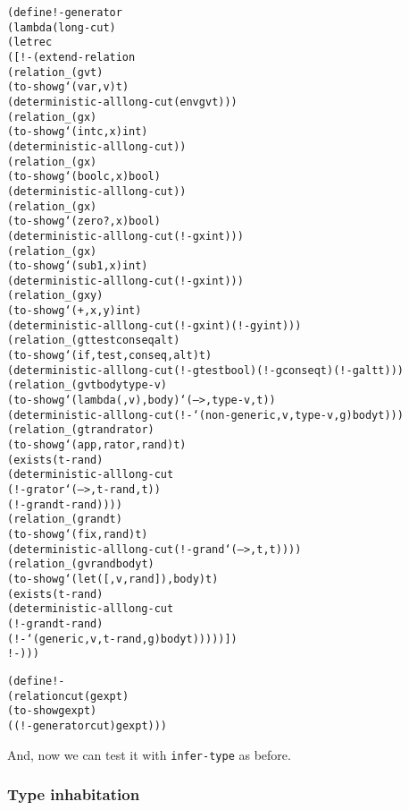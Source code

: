 \newpage
\begin{alltt}
(define !-generator
  (lambda (long-cut)
    (letrec
      ([!- (extend-relation
             (relation _ (g v t)
               (to-show g `(var ,v) t)
               (deterministic-all long-cut (env g v t)))
             (relation _ (g x)
               (to-show g `(intc ,x) int)
               (deterministic-all long-cut))
             (relation _ (g x)
               (to-show g `(boolc ,x) bool)
               (deterministic-all long-cut))
             (relation _ (g x)
               (to-show g `(zero? ,x) bool)
               (deterministic-all long-cut (!- g x int)))
             (relation _ (g x)
               (to-show g `(sub1 ,x) int)
               (deterministic-all long-cut (!- g x int)))
             (relation _ (g x y)
               (to-show g `(+ ,x ,y) int)
               (deterministic-all long-cut (!- g x int) (!- g y int)))
             (relation _ (g t test conseq alt)
               (to-show g `(if ,test ,conseq ,alt) t)
               (deterministic-all long-cut (!- g test bool) (!- g conseq t) (!- g alt t)))
             (relation _ (g v t body type-v)
               (to-show g `(lambda (,v) ,body) `(--> ,type-v ,t))
               (deterministic-all long-cut (!- `(non-generic ,v ,type-v ,g) body t)))
             (relation _ (g t rand rator)
               (to-show g `(app ,rator ,rand) t)
               (exists (t-rand)
                 (deterministic-all long-cut
                   (!- g rator `(--> ,t-rand ,t))
                   (!- g rand t-rand))))
             (relation _ (g rand t)
               (to-show g `(fix ,rand) t)
               (deterministic-all long-cut (!- g rand `(--> ,t ,t))))
             (relation _ (g v rand body t)
               (to-show g `(let ([,v ,rand]) ,body) t)
               (exists (t-rand)
                 (deterministic-all long-cut
                   (!- g rand t-rand)
                   (!- `(generic ,v ,t-rand ,g) body t)))))])
      !-)))
\end{alltt}
\newpage
\begin{alltt}
(define !-
  (relation cut (g exp t)
    (to-show g exp t)
    ((!-generator cut) g exp t)))
\end{alltt}

And, now we can test it with \texttt{infer-type} as before.

\subsubsection{Type inhabitation}

